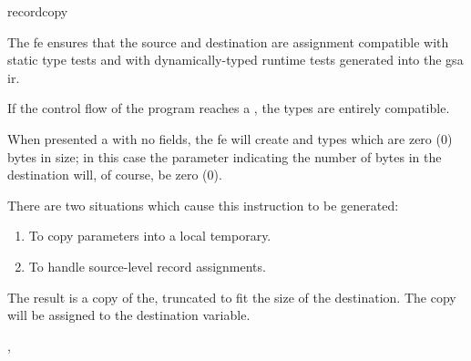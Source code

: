 \begin{instruction}{recordcopy}

  \begin{notes}
    The \ac{fe} ensures that the source and destination are assignment
    compatible with static type tests and with dynamically-typed
    runtime tests generated into the \ac{gsa} \ac{ir}.

    If the control flow of the program reaches a ,
    the types are entirely compatible.

    When presented a  with no fields, the \ac{fe} will
    create  and  types which are zero (0)
    bytes in size; in this case the parameter indicating the number of
    bytes in the destination will, of course, be zero (0).

    There are two situations which cause this instruction to be
    generated:
    \begin{enumerate}
    \item To copy \byval parameters into a local temporary.
    \item To handle source-level record assignments.
    \end{enumerate}
  \end{notes}

  \begin{results}
  \item The result is a copy of the, truncated to fit the size of the
    destination.  The copy will be assigned to the destination variable.
  \end{results}

  \begin{operands}
  \item {}
  \item {}
  \item {}
  \item {}
  \item {}
  \end{operands}

  \begin{seealso}
    , 
  \end{seealso}
\end{instruction}

